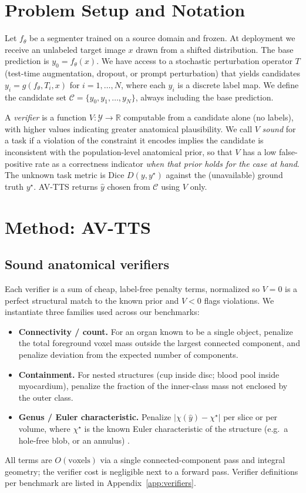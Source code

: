 \documentclass[10pt,twocolumn]{article}
\begin{document}
\section{Problem Setup and Notation}
Let $f_\theta$ be a segmenter trained on a source domain and frozen. At deployment we receive an unlabeled target image $x$ drawn from a shifted distribution. The base prediction is $y_0=f_\theta(x)$. We have access to a stochastic perturbation operator $T$ (test-time augmentation, dropout, or prompt perturbation) that yields candidates $y_i = g(f_\theta, T_i, x)$ for $i=1,\dots,N$, where each $y_i$ is a discrete label map. We define the candidate set $\mathcal{C}=\{y_0,y_1,\dots,y_N\}$, always including the base prediction.

A \emph{verifier} is a function $V:\mathcal{Y}\to\mathbb{R}$ computable from a candidate alone (no labels), with higher values indicating greater anatomical plausibility. We call $V$ \emph{sound} for a task if a violation of the constraint it encodes implies the candidate is inconsistent with the population-level anatomical prior, so that $V$ has a low false-positive rate as a correctness indicator \emph{when that prior holds for the case at hand}. The unknown task metric is Dice $D(y,y^\star)$ against the (unavailable) ground truth $y^\star$. AV-TTS returns $\hat y$ chosen from $\mathcal{C}$ using $V$ only.

\section{Method: AV-TTS}
\subsection{Sound anatomical verifiers}
Each verifier is a sum of cheap, label-free penalty terms, normalized so $V=0$ is a perfect structural match to the known prior and $V<0$ flags violations. We instantiate three families used across our benchmarks:
\begin{itemize}\setlength\itemsep{0.15em}
\item \textbf{Connectivity / count.} For an organ known to be a single object, penalize the total foreground voxel mass outside the largest connected component, and penalize deviation from the expected number of components.
\item \textbf{Containment.} For nested structures (cup inside disc; blood pool inside myocardium), penalize the fraction of the inner-class mass not enclosed by the outer class.
\item \textbf{Genus / Euler characteristic.} Penalize $|\chi(\hat y)-\chi^\star|$ per slice or per volume, where $\chi^\star$ is the known Euler characteristic of the structure (e.g.\ a hole-free blob, or an annulus) \citep{eulerchar2025}.
\end{itemize}
All terms are $O(\text{voxels})$ via a single connected-component pass and integral geometry; the verifier cost is negligible next to a forward pass. Verifier definitions per benchmark are listed in Appendix~\ref{app:verifiers}.
\end{document}
